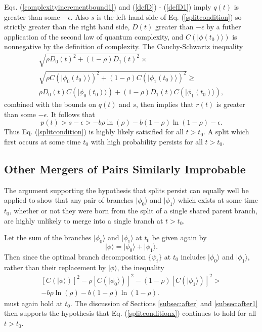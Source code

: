 \documentclass[12pt,amsmath,amssymb,onecolumn]{revtex4-2}
\begin{document}
Eqs. (\ref{complexityincrementbound1}) and (\ref{defD}) - (\ref{defD1}) imply $q(t)$ is 
greater than some $-\epsilon$.
Also $s$ is the left hand side of  Eq. (\ref{splitcondition})
so strictly greater than the right hand side, $D(t)$ greater than $-\epsilon$
by a futher application
of the second law of quantum complexity, and $C(|\phi(t_0) \rangle )$ is nonnegative by the definition of
complexity.
The Cauchy-Schwartz inequality 
\begin{multline}
  \label{cauchyschwartz}
  \sqrt{\rho D_0(t)^2 + (1 - \rho) D_1(t)^2} \times \\
  \sqrt{\rho C(|\phi_0(t_0) \rangle )^2 + (1 - \rho)C(|\phi_1(t_0) \rangle )^2} \ge \\  
\rho D_0(t)C(|\phi_0(t_0) \rangle ) + (1 - \rho) D_1(t)C(|\phi_1(t_0) \rangle ),
\end{multline}
combined with the bounds on $q(t)$ and $s$, then implies that
$r(t)$ is greater than some $-\epsilon$. It follows that
\begin{equation}
  \label{branchingt}
  p(t) > s - \epsilon >
  -b \rho \ln( \rho) - b ( 1 - \rho) \ln( 1 - \rho) - \epsilon.
\end{equation}
Thus Eq. (\ref{splitcondition}) is highly likely satisified for all $t > t_0$.
A split which first occurs at some time $t_0$ with
high probability persists
for all $t > t_0$.



\subsection{\label{subsec:dontmerge} Other Mergers of Pairs Similarly Improbable}

The argument supporting the hypothesis that splits persist can equally well be applied
to show that any pair of branches $|\phi_0 \rangle $ and
$|\phi_1 \rangle $ which exists at some time $t_0$, whether or
not they were born from the split
of a single shared parent branch, are highly unlikely to
merge into a single branch at $t > t_0$.

Let the sum of the branches $|\phi_0 \rangle $ and $|\phi_1 \rangle $ at $t_0$ be given
again by
\begin{equation}\label{splitphix}
|\phi \rangle  = |\phi_0 \rangle  + |\phi_1 \rangle .
\end{equation}
Then since the optimal branch decomposition
$\{ \psi_i\}$ at $t_0$ includes $|\phi_0 \rangle $ and $|\phi_1 \rangle $, rather than
their replacement by $|\phi \rangle $, the inequality
\begin{multline}\label{splitconditionx}
[C( |\phi \rangle )]^2 - \rho [C( |\phi_0 \rangle )]^2 - ( 1 - \rho) [C( |\phi_1 \rangle )]^2 > \\
-b \rho \ln( \rho) - b ( 1 - \rho) \ln( 1 - \rho).
\end{multline}
must again hold at $t_0$. The discussion of Sections \ref{subsec:after}
and \ref{subsec:after1} then supports the hypothesis that
Eq. (\ref{splitconditionx}) continues to hold for all $t > t_0$.
\end{document}
